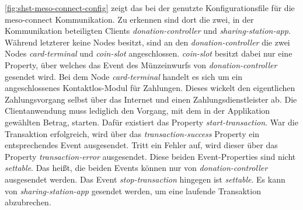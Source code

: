 \autoref{fig:shst-meso-connect-config} zeigt das bei der \shst{} genutzte Konfigurationsfile für die 
meso-connect Kommunikation. Zu erkennen sind dort die zwei, in der Kommunikation beteiligten Clients
\emph{donation-controller} und \emph{sharing-station-app}. Während letzterer keine Nodes
besitzt, sind an den \emph{donation-controller} die zwei Nodes \emph{card-terminal} und 
\emph{coin-slot} angeschlossen. \emph{coin-slot} besitzt dabei nur eine Property, über
welches das Event des Münzeinwurfs von \emph{donation-controller} gesendet wird. Bei dem Node
\emph{card-terminal} handelt es sich um ein angeschlossenes Kontaktlos-Modul für Zahlungen. Dieses wickelt
den eigentlichen Zahlungsvorgang selbst über das Internet und einen Zahlungsdienstleister ab. 
Die Clientanwendung muss lediglich den Vorgang, mit dem in der Applikation gewählten Betrag,
starten. Dafür existiert das Property \emph{start-transaction}. War die Transaktion erfolgreich,
wird über das \emph{transaction-success} Property ein entsprechendes Event ausgesendet. Tritt ein 
Fehler auf, wird dieser über das Property \emph{transaction-error} ausgesendet. Diese beiden Event-Properties
sind nicht \emph{settable}. Das heißt, die beiden Events können nur von \emph{donation-controller} ausgesendet
werden. Das Event \emph{stop-transaction} hingegen ist \emph{settable}. 
Es kann von \emph{sharing-station-app} gesendet werden, um eine laufende Transaktion abzubrechen. 


\iffalse
- Konfigurationsfile, Beispiel der JS Bib 
- JS API Dokumentation in den Anhang
\fi